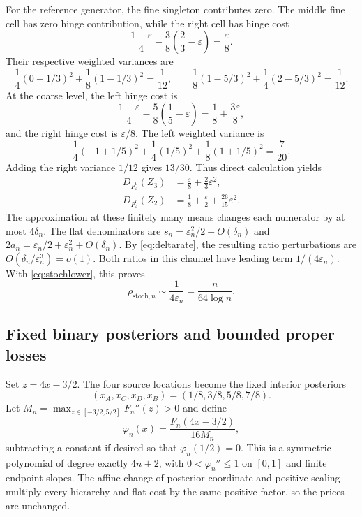 \documentclass[11pt]{article}
\theoremstyle{definition}\newtheorem{definition}[theorem]{Definition}
\theoremstyle{remark}\newtheorem{remark}[theorem]{Remark}
\newcommand{\ph}{\varphi}
\newcommand{\stp}{\mathrm{stoch}}
\begin{document}
For the reference generator, the fine singleton contributes zero. The middle fine cell has zero hinge contribution, while the right cell has hinge cost
\[
\frac{1-\varepsilon}4-\frac38\left(\frac23-\varepsilon\right)=\frac\varepsilon8.
\]
Their respective weighted variances are
\[
\frac14(0-1/3)^2+\frac18(1-1/3)^2=\frac1{12},\qquad
\frac18(1-5/3)^2+\frac14(2-5/3)^2=\frac1{12}.
\]
At the coarse level, the left hinge cost is
\[
\frac{1-\varepsilon}4-\frac58\left(\frac15-\varepsilon\right)
=\frac18+\frac{3\varepsilon}8,
\]
and the right hinge cost is $\varepsilon/8$. The left weighted variance is
\[
\frac14(-1+1/5)^2+\frac14(1/5)^2+\frac18(1+1/5)^2=\frac7{20}.
\]
Adding the right variance $1/12$ gives $13/30$. Thus direct calculation yields
\begin{align}
D_{F_\varepsilon^0}(Z_3)&=\frac\varepsilon8+\frac23\varepsilon^2,
\label{eq:channelcosts}\\
D_{F_\varepsilon^0}(Z_2)&=\frac18+\frac\varepsilon2+\frac{26}{15}\varepsilon^2.
\nonumber
\end{align}
The approximation at these finitely many means changes each numerator by at most $4\delta_n$. The flat denominators are $s_n=\varepsilon_n^2/2+O(\delta_n)$ and $2a_n=\varepsilon_n/2+\varepsilon_n^2+O(\delta_n)$. By \eqref{eq:deltarate}, the resulting ratio perturbations are $O(\delta_n/\varepsilon_n^3)=o(1)$. Both ratios in this channel have leading term $1/(4\varepsilon_n)$. With \eqref{eq:stochlower}, this proves
\begin{equation}
\rho_{\stp,n}\sim\frac1{4\varepsilon_n}=\frac{n}{64\log n}.
\label{eq:stochasymptotic}
\end{equation}

\subsection{Fixed binary posteriors and bounded proper losses}
\label{sec:normalization}
Set $z=4x-3/2$. The four source locations become the fixed interior posteriors
\begin{equation}
(x_A,x_C,x_D,x_B)=(1/8,3/8,5/8,7/8).
\label{eq:fixedposteriors}
\end{equation}
Let $M_n=\max_{z\in[-3/2,5/2]}F_n''(z)>0$ and define
\begin{equation}
\ph_n(x)=\frac{F_n(4x-3/2)}{16M_n},
\label{eq:normalize}
\end{equation}
subtracting a constant if desired so that $\ph_n(1/2)=0$. This is a symmetric polynomial of degree exactly $4n+2$, with $0<\ph_n''\le1$ on $[0,1]$ and finite endpoint slopes. The affine change of posterior coordinate and positive scaling multiply every hierarchy and flat cost by the same positive factor, so the prices are unchanged.
\end{document}
